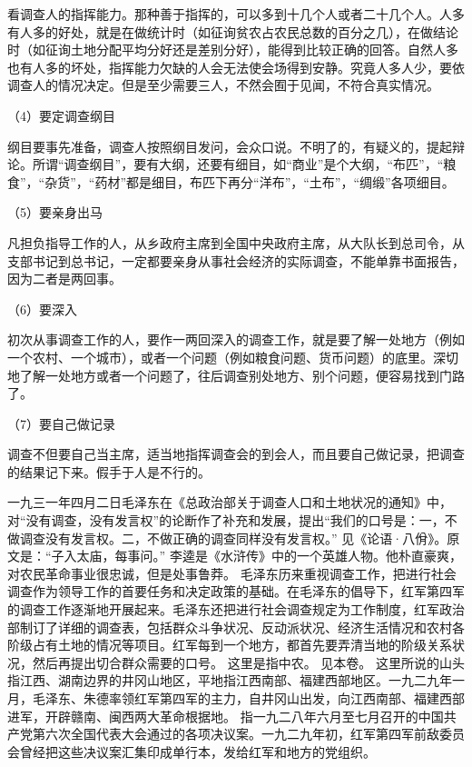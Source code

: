 看调查人的指挥能力。那种善于指挥的，可以多到十几个人或者二十几个人。人多有人多的好处，就是在做统计时（如征询贫农占农民总数的百分之几），在做结论时（如征询土地分配平均分好还是差别分好），能得到比较正确的回答。自然人多也有人多的坏处，指挥能力欠缺的人会无法使会场得到安静。究竟人多人少，要依调查人的情况决定。但是至少需要三人，不然会囿于见闻，不符合真实情况。

（4）要定调查纲目

纲目要事先准备，调查人按照纲目发问，会众口说。不明了的，有疑义的，提起辩论。所谓“调查纲目”，要有大纲，还要有细目，如“商业”是个大纲，“布匹”，“粮食”，“杂货”，“药材”都是细目，布匹下再分“洋布”，“土布”，“绸缎”各项细目。

（5）要亲身出马

凡担负指导工作的人，从乡政府主席到全国中央政府主席，从大队长到总司令，从支部书记到总书记，一定都要亲身从事社会经济的实际调查，不能单靠书面报告，因为二者是两回事。

（6）要深入

初次从事调查工作的人，要作一两回深入的调查工作，就是要了解一处地方（例如一个农村、一个城市），或者一个问题（例如粮食问题、货币问题）的底里。深切地了解一处地方或者一个问题了，往后调查别处地方、别个问题，便容易找到门路了。

（7）要自己做记录

调查不但要自己当主席，适当地指挥调查会的到会人，而且要自己做记录，把调查的结果记下来。假手于人是不行的。


\begin{maonote}
一九三一年四月二日毛泽东在《总政治部关于调查人口和土地状况的通知》中，对“没有调查，没有发言权”的论断作了补充和发展，提出“我们的口号是：一，不做调查没有发言权。二，不做正确的调查同样没有发言权。”
见《论语·八佾》。原文是：“子入太庙，每事问。”
李逵是《水浒传》中的一个英雄人物。他朴直豪爽，对农民革命事业很忠诚，但是处事鲁莽。
毛泽东历来重视调查工作，把进行社会调查作为领导工作的首要任务和决定政策的基础。在毛泽东的倡导下，红军第四军的调查工作逐渐地开展起来。毛泽东还把进行社会调查规定为工作制度，红军政治部制订了详细的调查表，包括群众斗争状况、反动派状况、经济生活情况和农村各阶级占有土地的情况等项目。红军每到一个地方，都首先要弄清当地的阶级关系状况，然后再提出切合群众需要的口号。
这里是指中农。
见本卷。
这里所说的山头指江西、湖南边界的井冈山地区，平地指江西南部、福建西部地区。一九二九年一月，毛泽东、朱德率领红军第四军的主力，自井冈山出发，向江西南部、福建西部进军，开辟赣南、闽西两大革命根据地。
指一九二八年六月至七月召开的中国共产党第六次全国代表大会通过的各项决议案。一九二九年初，红军第四军前敌委员会曾经把这些决议案汇集印成单行本，发给红军和地方的党组织。
\end{maonote}
